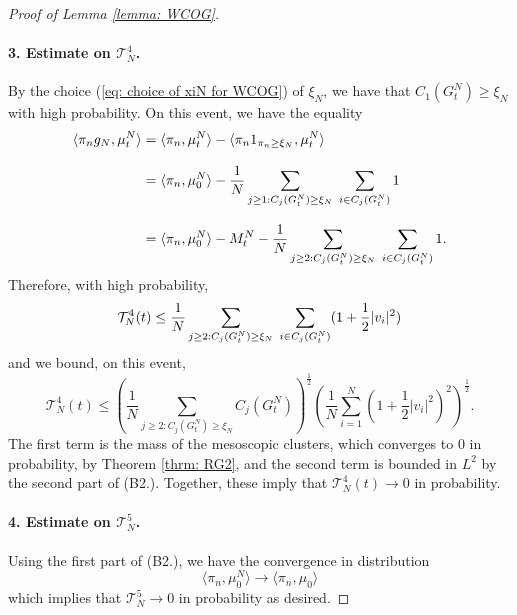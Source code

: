 \documentclass[11pt, notitlepage]{article}
\begin{document}
\begin{proof}[Proof of Lemma \ref{lemma: WCOG}]
\paragraph{3. Estimate on $\mathcal{T}^4_N$.} By the choice (\ref{eq: choice of xiN for WCOG}) of $\xi_N$, we have that $ C_1(G^N_t) \ge \xi_N$ with high probability. On this event, we have the equality \begin{equation}
           \begin{split}
               \langle \pi_n g_N, \mu^N_t\rangle &=\langle \pi_n, \mu^N_t\rangle - \langle \pi_n 1_{\pi_n\geq \xi_N}, \mu^N_t\rangle \\[2ex] & = \langle \pi_n, \mu^N_0\rangle-\frac{1}{N}\sum_{j\geq 1: C_j(G^N_t)\ge \xi_N} \hspace{0.1cm}\sum_{i \in C_j(G^N_t)} 1 \\[2ex] & = \langle \pi_n, \mu^N_0\rangle-M^N_t-\frac{1}{N}\sum_{j\ge 2:C_j(G^N_t)\ge \xi_N}\hspace{0.1cm}\sum_{i\in C_j(G^N_t)}1. 
           \end{split} 
       \end{equation} Therefore, with high probability, \begin{equation}\label{eq: bound on T4} \mathcal{T}^4_N(t) \le \frac{1}{N} \sum_{j\ge 2:C_j(G^N_t)\ge \xi_N} \hspace{0.1cm}\sum_{i\in C_j(G^N_t)} (1+\frac{1}{2}|v_i|^2) \end{equation} and we bound, on this event, \begin{equation}\mathcal{T}^4_N(t) \le \left(\frac{1}{N}\sum_{j\ge 2: C_j(G^N_t)\ge \xi_N} C_j(G^N_t)\right)^\frac{1}{2}\left(\frac{1}{N}\sum_{i=1}^N (1+\frac{1}{2}|v_i|^2)^2\right)^\frac{1}{2}. \end{equation} The first term is the mass of the mesoscopic clusters, which converges to $0$ in probability, by Theorem \ref{thrm: RG2}, and the second term is bounded in $L^2$ by the second part of (B2.). Together, these imply that $\mathcal{T}^4_N(t)\rightarrow 0$ in probability.
 \paragraph{4. Estimate on $\mathcal{T}^5_N$.} Using the first part of (B2.), we have the convergence in distribution \begin{equation} \langle \pi_n, \mu^N_0\rangle \rightarrow \langle \pi_n, \mu_0\rangle \end{equation} which implies that $\mathcal{T}^5_N\rightarrow 0$ in probability as desired. 

\end{proof}
\end{document}
